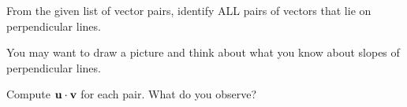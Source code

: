 \documentclass{ximera}
\begin{document}
\begin{problem}\label{prob:perpvectors1}
From the given list of vector pairs, identify ALL pairs of vectors that lie on perpendicular lines.
\begin{hint}
You may want to draw a picture and think about what you know about slopes of perpendicular lines.
\end{hint}
\begin{selectAll}
\end{selectAll}
Compute $\mathbf{u}\cdot\mathbf{v}$ for each pair.  What do you observe? 
\end{problem}

  
\end{document}
